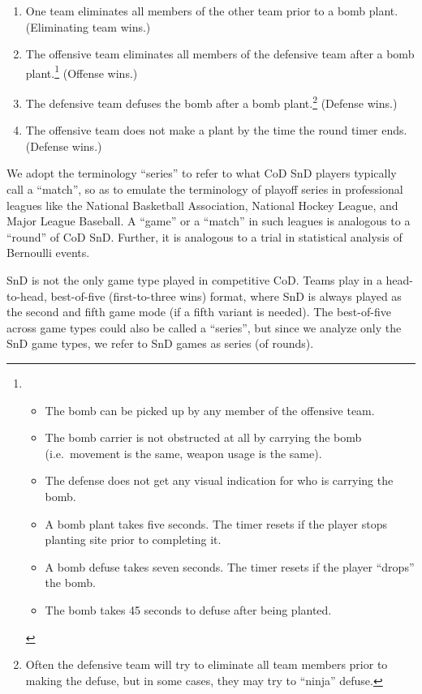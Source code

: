 \documentclass{article}
\providecommand{\tightlist}{%
  \setlength{\itemsep}{0pt}\setlength{\parskip}{0pt}}
\begin{document}
\begin{enumerate}
\def\labelenumi{\arabic{enumi}.}
\tightlist
\item
  One team eliminates all members of the other team prior to a bomb
  plant. (Eliminating team wins.)
\item
  The offensive team eliminates all members of the defensive team after
  a bomb plant.\footnote{\begin{itemize}
    \tightlist
    \item
      The bomb can be picked up by any member of the offensive team.
    \item
      The bomb carrier is not obstructed at all by carrying the bomb
      (i.e.~movement is the same, weapon usage is the same).
    \item
      The defense does not get any visual indication for who is carrying
      the bomb.
    \item
      A bomb plant takes five seconds. The timer resets if the player
      stops planting site prior to completing it.
    \item
      A bomb defuse takes seven seconds. The timer resets if the player
      ``drops'' the bomb.
    \item
      The bomb takes 45 seconds to defuse after being planted.
    \end{itemize}} (Offense wins.)
\item
  The defensive team defuses the bomb after a bomb plant.\footnote{Often
    the defensive team will try to eliminate all team members prior to
    making the defuse, but in some cases, they may try to ``ninja''
    defuse.} (Defense wins.)
\item
  The offensive team does not make a plant by the time the round timer
  ends. (Defense wins.)
\end{enumerate}

We adopt the terminology ``series'' to refer to what CoD SnD players
typically call a ``match'', so as to emulate the terminology of playoff
series in professional leagues like the National Basketball Association,
National Hockey League, and Major League Baseball. A ``game'' or a
``match'' in such leagues is analogous to a ``round'' of CoD SnD.
Further, it is analogous to a trial in statistical analysis of Bernoulli
events.

SnD is not the only game type played in competitive CoD. Teams play in a
head-to-head, best-of-five (first-to-three wins) format, where SnD is
always played as the second and fifth game mode (if a fifth variant is
needed). The best-of-five across game types could also be called a
``series'', but since we analyze only the SnD game types, we refer to
SnD games as series (of rounds).
\end{document}
